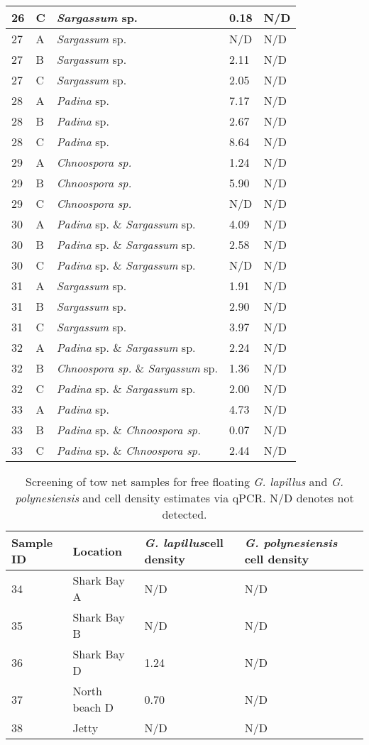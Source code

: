 \documentclass[12pt]{article}
\begin{document}
\begin{longtable}{ | p{1cm} | p{1cm} | p{3cm} | p{4cm} | p{4cm} | }
\hline
26&C&\emph{Sargassum} sp.&0.18
&N/D\\
\hline
27&A&\emph{Sargassum} sp.&N/D&N/D\\
\hline
27&B&\emph{Sargassum} sp.&2.11
&N/D\\
\hline
27&C&\emph{Sargassum} sp.&2.05
&N/D\\
\hline
28&A&\emph{Padina} sp.&7.17
&N/D\\
\hline
28&B&\emph{Padina} sp.&2.67
&N/D\\
\hline
28&C&\emph{Padina} sp.&8.64
&N/D\\
\hline
29&A&\emph{Chnoospora sp.}&1.24
&N/D\\
\hline
29&B&\emph{Chnoospora sp.}&5.90
&N/D\\
\hline
29&C&\emph{Chnoospora sp.}&N/D&N/D\\
\hline
30&A&\emph{Padina} sp. \& \emph{Sargassum} sp.&4.09
&N/D\\
\hline
30&B&\emph{Padina} sp. \& \emph{Sargassum} sp.&2.58
&N/D\\
\hline
30&C&\emph{Padina} sp. \& \emph{Sargassum} sp.&N/D&N/D\\
\hline
31&A&\emph{Sargassum} sp.&1.91
&N/D\\
\hline
31&B&\emph{Sargassum} sp.&2.90
&N/D\\
\hline
31&C&\emph{Sargassum} sp.&3.97
&N/D\\
\hline
32&A&\emph{Padina} sp. \& \emph{Sargassum} sp.&2.24
&N/D\\
\hline
32&B&\emph{Chnoospora sp.} \& \emph{Sargassum} sp.&1.36
&N/D\\
\hline
32&C&\emph{Padina} sp. \& \emph{Sargassum} sp.&2.00
&N/D\\
\hline
33&A&\emph{Padina} sp.&4.73
&N/D\\
\hline
33&B&\emph{Padina} sp. \& \emph{Chnoospora sp.}&0.07
&N/D\\
\hline
33&C&\emph{Padina} sp. \& \emph{Chnoospora sp.}&2.44
&N/D\\
\hline
\end{longtable}
\FloatBarrier
\FloatBarrier
\begin{table}
\caption{Screening of tow net samples for free floating \emph{G. lapillus} and \emph{G. polynesiensis} and cell density estimates via qPCR. N/D denotes not detected.}
\label{tbl:NetTable}
\begin{tabular}{ | p{4cm} | p{4cm} |p{4cm} | p{4cm} | }
\hline
\textbf{Sample ID}&\textbf{Location}&\textbf{\emph{G. lapillus}cell density}&\textbf{\emph{G. polynesiensis} cell density}\\
\hline
34&Shark Bay A&N/D&N/D\\ %
\hline
35&Shark Bay B&N/D&N/D\\
\hline
36&Shark Bay D&1.24
&N/D\\
\hline
37&North beach D&0.70
&N/D\\
\hline
38&Jetty&N/D
&N/D\\
\hline
\end{tabular}
\end{table}
\FloatBarrier
\newpage
\end{document}

